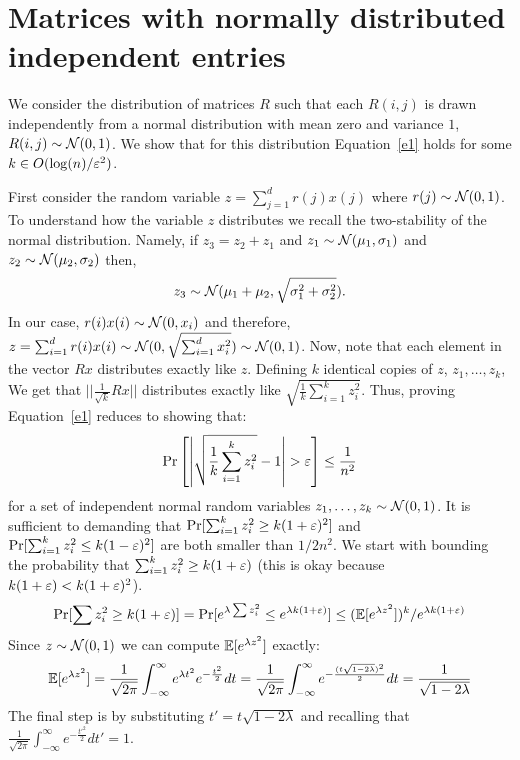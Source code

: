 \documentclass{article}
\begin{document}
\section{Matrices with normally distributed independent entries}
We consider the distribution of matrices $R$ such that each $R(i,j)$ is drawn independently from  a
normal distribution with mean zero and variance $1$, $R(i,j) \sim {\mathcal{N}}(0,1)$. We show that for this
distribution Equation~\ref{e1} holds for some $k \in O(\log(n)/\varepsilon^2)$.

First consider the random variable $z = \sum_{j=1}^{d}r(j)x(j)$ where $r(j) \sim {\mathcal{N}}(0,1)$. 
To understand how the variable $z$ distributes we recall the two-stability of the
normal distribution. Namely, if $z_3 = z_2 + z_1$ and 
$z_1 \sim {\mathcal{N}}(\mu_1,\sigma_{1})$ and $z_2 \sim {\mathcal{N}}(\mu_2,\sigma_{2})$ then, $$z_3 \sim {\mathcal{N}}(\mu_1 + \mu_2,\sqrt{\sigma^{2}_{1} + \sigma^{2}_{2}}).$$
In our case,  $r(i)x(i) \sim {\mathcal{N}}(0,x_{i})$ and therefore, $z = \sum_{i=1}^{d}r(i)x(i) \sim {\mathcal{N}}(0,\sqrt{\sum_{i=1}^{d}x^{2}_{i}}) \sim {\mathcal{N}}(0,1)$.
%
Now, note that each element in the vector $Rx$ distributes exactly like $z$.
Defining $k$ identical copies of $z$, $z_1,\ldots,z_k$,
We get that $||\frac{1}{\sqrt{k}}Rx||$ distributes exactly like $\sqrt{\frac{1}{k}\sum_{i=1}^{k} z^{2}_{i}}$.
Thus, proving Equation~\ref{e1} reduces to showing that:
\begin{equation}
\Pr\left[ \left| \sqrt{\frac{1}{k}\sum_{i=1}^{k} z^{2}_{i}} - 1 \right| > \varepsilon \right] \le \frac{1}{n^2} 
\end{equation}
for a set of independent normal random variables $z_1,\ldots,z_k \sim {\mathcal{N}}(0,1)$.
It is sufficient to demanding that $\Pr[\sum_{i=1}^{k} z^{2}_{i} \ge k(1+\varepsilon)^2]$ and $\Pr[\sum_{i=1}^{k} z^{2}_{i} \le k(1-\varepsilon)^2]$ are both smaller than $1/2n^2$.
We start with bounding the probability that $\sum_{i=1}^{k} z^{2}_{i} \ge k(1+\varepsilon)$ (this is okay because $k(1+\varepsilon) < k(1+\varepsilon)^2$).
\[
\Pr[\sum z^{2}_{i} \ge k(1+\varepsilon)] = \Pr[e^{\lambda \sum z^{2}_{i}} \le e^{\lambda k (1+\varepsilon)}] \le ({\mathbb E}[e^{\lambda z^2}])^k/e^{\lambda k (1+\varepsilon)}
\]
Since $z \sim {\mathcal{N}}(0,1)$ we can compute ${\mathbb E}[e^{\lambda z^2}]$ exactly:
\[
\E [e^{\lambda z^{2}}] = \frac{1}{\sqrt{2\pi}}\int_{-\infty}^{\infty} e^{\lambda t^{2}} e^{-\frac{t^{2}}{2}} dt =\frac{1}{\sqrt{2\pi}}\int_{-\infty}^{\infty} e^{-\frac{(t\sqrt{1-2\lambda})^{2}}{2}}dt = \frac{1}{\sqrt{1-2\lambda}}%
\]
The final step is by substituting $t' = t\sqrt{1-2\lambda}$ and recalling that $\frac{1}{\sqrt{2\pi}}\int_{-\infty}^{\infty} e^{-\frac{t'^{2}}{2}}dt' = 1$.
\end{document}
